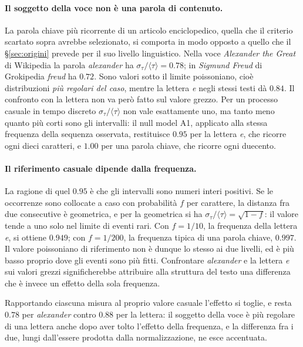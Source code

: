 \paragraph{Il soggetto della voce non è una parola di contenuto.}
La parola chiave più ricorrente di un articolo enciclopedico, quella che il
criterio scartato sopra avrebbe selezionato, si comporta in modo opposto a
quello che il §\ref{sec:origini} prevede per il suo livello linguistico. Nella
voce \emph{Alexander the Great} di Wikipedia la parola \emph{alexander} ha
$\sigma_\tau/\langle\tau\rangle = 0.78$; in \emph{Sigmund Freud} di Grokipedia
\emph{freud} ha $0.72$. Sono valori sotto il limite poissoniano, cioè
distribuzioni \emph{più regolari del caso}, mentre la lettera \emph{e} negli
stessi testi dà $0.84$. Il confronto con la lettera non va però fatto sul valore
grezzo. Per un processo casuale in tempo discreto
$\sigma_\tau/\langle\tau\rangle$ non vale esattamente uno, ma tanto meno quanto
più corti sono gli intervalli: il null model A1, applicato alla stessa frequenza
della sequenza osservata, restituisce $0.95$ per la lettera \emph{e}, che ricorre
ogni dieci caratteri, e $1.00$ per una parola chiave, che ricorre ogni
duecento.

\paragraph{Il riferimento casuale dipende dalla frequenza.}
La ragione di quel $0.95$ è che gli intervalli sono numeri interi positivi. Se
le occorrenze sono collocate a caso con probabilità $f$ per carattere, la
distanza fra due consecutive è geometrica, e per la geometrica si ha
$\sigma_\tau/\langle\tau\rangle = \sqrt{1-f}$: il valore tende a uno solo nel
limite di eventi rari. Con $f = 1/10$, la frequenza della lettera \emph{e}, si
ottiene $0.949$; con $f = 1/200$, la frequenza tipica di una parola chiave,
$0.997$. Il valore poissoniano di riferimento non è dunque lo stesso ai due
livelli, ed è più basso proprio dove gli eventi sono più fitti. Confrontare
\emph{alexander} e la lettera \emph{e} sui valori grezzi significherebbe
attribuire alla struttura del testo una differenza che è invece un effetto
della sola frequenza.

Rapportando ciascuna misura al proprio valore casuale l'effetto si toglie, e
resta $0.78$ per \emph{alexander} contro $0.88$ per la lettera: il soggetto
della voce è più regolare di una lettera anche dopo aver tolto l'effetto della
frequenza, e la differenza fra i due, lungi dall'essere prodotta dalla
normalizzazione, ne esce accentuata.

